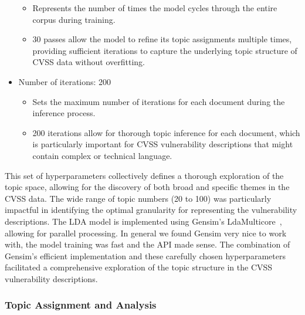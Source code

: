 \documentclass[12pt]{article}
\begin{document}
\begin{itemize}
	      \begin{itemize}

		      \item Represents the number of times the model cycles through the entire corpus during
		            training.

		      \item 30 passes allow the model to refine its topic assignments multiple times,
		            providing sufficient iterations to capture the underlying topic structure of CVSS
		            data without overfitting.

	      \end{itemize}

	\item Number of iterations: {200}

	      \begin{itemize}

		      \item Sets the maximum number of iterations for each document during the inference
		            process.

		      \item 200 iterations allow for thorough topic inference for each document, which is
		            particularly important for CVSS vulnerability descriptions that might contain
		            complex or technical language.

	      \end{itemize}

\end{itemize}

This set of hyperparameters collectively defines a thorough exploration of the topic space, allowing
for the discovery of both broad and specific themes in the CVSS data. The wide range of topic
numbers (20 to 100) was particularly impactful in identifying the optimal granularity for
representing the vulnerability descriptions. The LDA model is implemented using Gensim's
LdaMulticore~\cite{gensim}, allowing for parallel processing. In general we found Gensim very nice to
work with, the model training was fast and the API made sense. The combination of Gensim's efficient
implementation and these carefully chosen hyperparameters facilitated a comprehensive exploration of
the topic structure in the CVSS vulnerability descriptions.


\subsubsection{Topic Assignment and Analysis}
\end{document}
